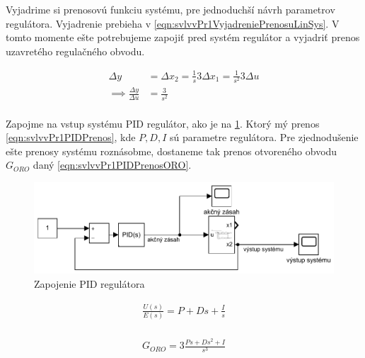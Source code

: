 	Vyjadrime si prenosovú funkciu systému, pre jednoduchší návrh parametrov regulátora. Vyjadrenie prebieha v \cref{eqn:svlvvPr1VyjadreniePrenosuLinSys}. V tomto momente ešte potrebujeme zapojiť pred systém regulátor a vyjadriť prenos uzavretého regulačného obvodu.
	
	\begin{equation}
	\begin{aligned}
		\Delta  y &= \Delta x_2 = \frac{1}{s}  3 \Delta x_1 = \frac{1}{s^2}  3 \Delta u \\
		\implies \frac{\Delta y}{\Delta u } &= \frac{3}{s^2} \\
	\end{aligned}
	\label{eqn:svlvvPr1VyjadreniePrenosuLinSys}
	\end{equation}
	
	Zapojme na vstup systému PID regulátor, ako je na \cref{fig:svlvvPr1ZapojeinePIDNaLinSys}. Ktorý mý prenos \cref{eqn:svlvvPr1PIDPrenos}, kde $P, D, I$ sú parametre regulátora. Pre zjednodušenie ešte prenosy systému roznásobme, dostaneme tak prenos otvoreného obvodu $G_{ORO}$ daný \cref{eqn:svlvvPr1PIDPrenosORO}. 
	
	
	\begin{figure}[h!]
		\centering
		\includegraphics[width=0.8\linewidth]{./figures/svlvvPr1ZapojeniePID-crop}
		\caption{Zapojenie PID regulátora}
		\label{fig:svlvvPr1ZapojeinePIDNaLinSys}
	\end{figure}
	
	\begin{equation}
		\begin{aligned}
			\frac{U(s)}{E(s)} = P + Ds + \frac{I}{s} \\
		\end{aligned}
		\label{eqn:svlvvPr1PIDPrenos}
	\end{equation}
	
	\begin{equation}
	\begin{aligned}
	G_{ORO} = 3\frac{Ps + Ds^2 + I}{s^3} \\
	\end{aligned}
	\label{eqn:svlvvPr1PIDPrenosORO}
	\end{equation}
	
